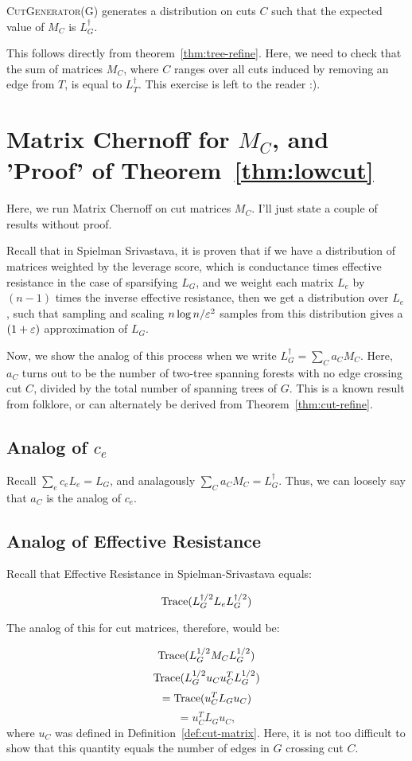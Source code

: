 \begin{theorem}
  \textsc{CutGenerator(G)} generates a distribution on cuts $C$ such
  that the expected value of $M_C$ is $L_G^\dag$.
\end{theorem}
This follows directly from theorem~\ref{thm:tree-refine}. Here, we need
to check that the sum of matrices $M_C$, where $C$ ranges over all cuts induced
by removing an edge from $T$, is equal to $L_T^\dag$. This exercise is
left to the reader :).
\section{Matrix Chernoff for $M_C$, and 'Proof' of
Theorem~\ref{thm:lowcut}}

Here, we run Matrix Chernoff on cut matrices $M_C$. I'll just state a
couple of results without proof.

Recall that in Spielman Srivastava, it is proven that if we have a
distribution of matrices weighted by the leverage score, which is
conductance times effective resistance in the case of sparsifying $L_G$,
and we weight each matrix $L_e$ by $(n-1)$ times the inverse effective resistance,
then we get a distribution over $L_e$, such that sampling and scaling
$n \log n / \varepsilon^2$ samples from this distribution gives a $(1+\varepsilon)$
approximation of $L_G$.

Now, we show the analog of this process when we write $L_G^\dag = \sum_C a_C
M_C$.  Here, $a_C$ turns out to be the number of two-tree spanning
forests with no edge crossing cut $C$, divided by the total number of
spanning trees of $G$. This is a known result from
folklore, or can alternately be derived from
Theorem~\ref{thm:cut-refine}.

\subsection{Analog of $c_e$}
Recall $\sum_e c_e L_e = L_G$, and analagously $\sum_C a_C M_C =
L_G^\dag$. Thus, we can loosely say that $a_C$ is the analog of $c_e$.
\subsection{Analog of Effective Resistance}
Recall that Effective Resistance in Spielman-Srivastava equals:

\[ \mbox{Trace}(L_G^{\dag/2} L_e L_G^{\dag/2}) \]

The analog of this for cut matrices, therefore, would be:

\[ \mbox{Trace}(L_G^{1/2} M_C L_G^{1/2} )\]
\[ \mbox{Trace}(L_G^{1/2} u_Cu_C^T L_G^{1/2}) \]
\[ = \mbox{Trace}(u_C^T L_G u_C )\]
\[ = u_C^T L_G u_C, \]
where $u_C$ was defined in Definition~\ref{def:cut-matrix}.  Here, it is not
too difficult to show that this quantity equals the number of edges
in $G$ crossing cut $C$.

